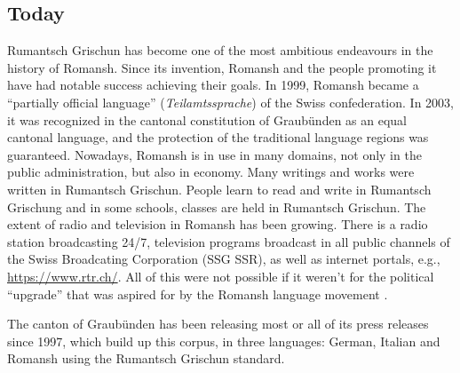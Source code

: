 \subsection{Today}
Rumantsch Grischun has become one of the most ambitious endeavours in the history of Romansh. 
Since its invention, Romansh and the people promoting it have had notable success achieving their goals. 
In 1999, Romansh became a \enquote{partially official language} (\emph{Teilamtssprache}) of the Swiss confederation. 
In 2003, it was recognized in the cantonal constitution of Graubünden as an equal cantonal language, and the protection of the traditional language regions was guaranteed.
Nowadays, Romansh is in use in many domains, not only in the public administration, but also in economy. 
Many writings and works were written in Rumantsch Grischun. 
People learn to read and write in Rumantsch Grischung and in some schools, classes are held in Rumantsch Grischun. 
The extent of radio and television in Romansh has been growing. 
There is a radio station broadcasting 24/7, television programs broadcast in all public channels of the Swiss Broadcating Corporation (SSG SSR), as well as  internet portals, e.g., \url{https://www.rtr.ch/}. All of this were not possible if it weren't for the political \enquote{upgrade} that was aspired for by the Romansh language movement \autocite{cathomas2012}.

The canton of Graubünden has been releasing most or all of its press releases since 1997, which build up this corpus, in three languages: German, Italian and Romansh using the Rumantsch Grischun standard.




